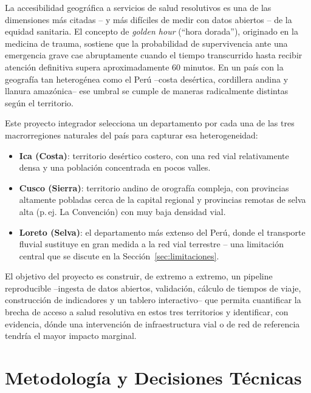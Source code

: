 \documentclass[11pt]{article}
\begin{document}
La accesibilidad geográfica a servicios de salud resolutivos es una de las
dimensiones más citadas -- y más difíciles de medir con datos abiertos -- de
la equidad sanitaria. El concepto de \textit{golden hour} (``hora dorada''),
originado en la medicina de trauma, sostiene que la probabilidad de
supervivencia ante una emergencia grave cae abruptamente cuando el tiempo
transcurrido hasta recibir atención definitiva supera aproximadamente 60
minutos. En un país con la geografía tan heterogénea como el Perú --costa
desértica, cordillera andina y llanura amazónica-- ese umbral se cumple de
maneras radicalmente distintas según el territorio.

Este proyecto integrador selecciona un departamento por cada una de las
tres macrorregiones naturales del país para capturar esa heterogeneidad:

\begin{itemize}
  \item \textbf{Ica (Costa)}: territorio desértico costero, con una red vial
    relativamente densa y una población concentrada en pocos valles.
  \item \textbf{Cusco (Sierra)}: territorio andino de orografía compleja,
    con provincias altamente pobladas cerca de la capital regional y
    provincias remotas de selva alta (p.\,ej. La Convención) con muy baja
    densidad vial.
  \item \textbf{Loreto (Selva)}: el departamento más extenso del Perú,
    donde el transporte fluvial sustituye en gran medida a la red vial
    terrestre -- una limitación central que se discute en la
    Sección~\ref{sec:limitaciones}.
\end{itemize}

El objetivo del proyecto es construir, de extremo a extremo, un pipeline
reproducible --ingesta de datos abiertos, validación, cálculo de tiempos de
viaje, construcción de indicadores y un tablero interactivo-- que permita
cuantificar la brecha de acceso a salud resolutiva en estos tres territorios
y identificar, con evidencia, dónde una intervención de infraestructura vial
o de red de referencia tendría el mayor impacto marginal.

\section{Metodología y Decisiones Técnicas}
\end{document}
